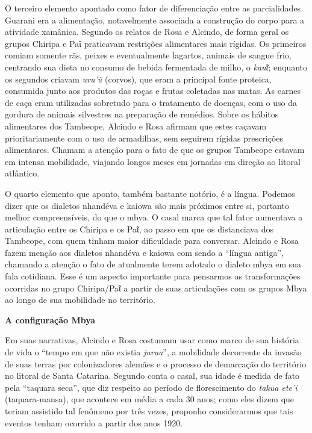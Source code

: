 O terceiro elemento apontado como fator de diferenciação entre as
parcialidades Guarani era a alimentação, notavelmente associada a
construção do corpo para a atividade xamânica. Segundo os relatos de
Rosa e Alcindo, de forma geral os grupos Chiripa e Paῖ praticavam
restrições alimentares mais rígidas. Os primeiros comiam somente rãs,
peixes e eventualmente lagartos, animais de sangue frio, centrando sua
dieta no consumo de bebida fermentada de milho, o \emph{kauῖ}; enquanto
os segundos criavam \emph{uru'ũ} (corvos), que eram a principal fonte
proteica, consumida junto aos produtos das roças e frutas coletadas nas
matas. As carnes de caça eram utilizadas sobretudo para o tratamento de
doenças, com o uso da gordura de animais silvestres na preparação de
remédios. Sobre os hábitos alimentares dos Tambeope, Alcindo e Rosa
afirmam que estes caçavam prioritariamente com o uso de armadilhas, sem
seguirem rígidas prescrições alimentares. Chamam a atenção para o fato
de que os grupos Tambeope estavam em intensa mobilidade, viajando longos
meses em jornadas em direção ao litoral atlântico.

O quarto elemento que aponto, também bastante notório, é a língua.
Podemos dizer que os dialetos nhandéva e kaiowa são mais próximos entre
si, portanto melhor compreensíveis, do que o mbya. O casal marca que tal
fator aumentava a articulação entre os Chiripa e os Paῖ, ao passo em que
os distanciava dos Tambeope, com quem tinham maior dificuldade para
conversar. Alcindo e Rosa fazem menção aos dialetos nhandéva e kaiowa
com sendo a ``língua antiga'', chamando a atenção o fato de atualmente
terem adotado o dialeto mbya em sua fala cotidiana. Esse é um aspecto
importante para pensarmos as transformações ocorridas no grupo
Chiripa/Paῖ a partir de suas articulações com os grupos Mbya ao longo de
sua mobilidade no território.

\textbf{A configuração Mbya}

Em suas narrativas, Alcindo e Rosa costumam usar como marco de sua
história de vida o ``tempo em que não existia \emph{jurua}'', a
mobilidade decorrente da invasão de suas terras por colonizadores
alemães e o processo de demarcação do território no litoral de Santa
Catarina. Segundo conta o casal, sua idade é medida de fato pela
``taquara seca'', que diz respeito ao período de florescimento do
\emph{takua ete'i} (taquara-mansa), que acontece em média a cada 30
anos; como eles dizem que teriam assistido tal fenômeno por três vezes,
proponho considerarmos que tais eventos tenham ocorrido a partir dos
anos 1920.

